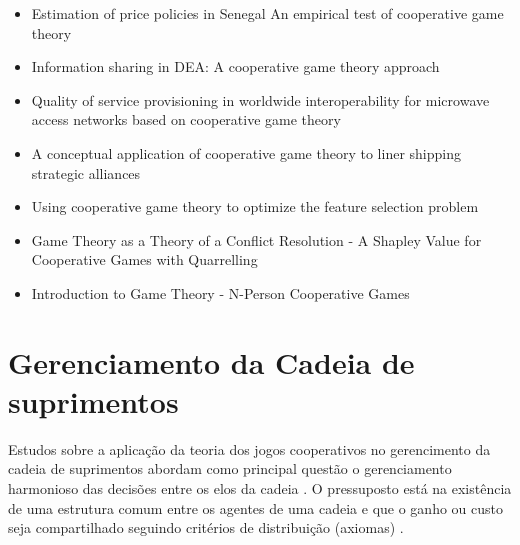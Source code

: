 \documentclass[
	article,			        %
	11pt,				          %
	oneside,			        %
	a4paper,			        %
	english,			        %
	brazil,				        %
	sumario=tradicional
]{abntex2}\usepackage[]{graphicx}\usepackage[]{color}
\begin{document}
\begin{itemize}
    \item Estimation of price policies in Senegal An empirical test of cooperative game theory \cite{Beghin.1991}
    \item Information sharing in DEA: A cooperative game theory approach \cite{Lozano.2012}
    \item Quality of service provisioning in worldwide interoperability for microwave access networks based on cooperative game theory \cite{Jiao.2011}
    \item A conceptual application of cooperative game theory to liner shipping strategic alliances \cite{Song.2002}
    \item Using cooperative game theory to optimize the feature selection problem \cite{Sun.2012}
    \item Game Theory as a Theory of a Conflict Resolution - A Shapley Value for Cooperative Games with Quarrelling \cite{Rapoport.1974}
    \item Introduction to Game Theory - N-Person Cooperative Games \cite{Morris.1994}    
  \end{itemize}
  
\section{Gerenciamento da Cadeia de suprimentos}

Estudos sobre a aplicação da teoria dos jogos cooperativos no gerencimento da cadeia de suprimentos abordam como principal questão o gerenciamento harmonioso das decisões entre os elos da cadeia \cite{Dobos.2010a}. O pressuposto está na exist\^encia de uma estrutura comum entre os agentes de uma cadeia e que o ganho ou custo seja compartilhado seguindo critérios de distribuição (axiomas) \cite{Bezerra.2009}.
\end{document}
